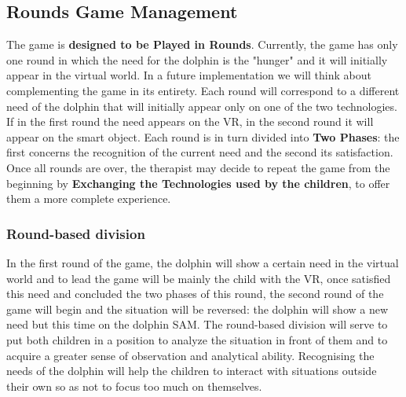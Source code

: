 \documentclass [12pt]{article}
\begin{document}
\subsection{Rounds Game Management}
The game is \textbf{designed to be Played in Rounds}. Currently, the game has only one round in which the need for the dolphin is the "hunger" and it  will initially appear in the virtual world. In a future implementation we will think about complementing the game in its entirety. 
Each round will correspond to a different need of the dolphin that will initially appear only on one of the two technologies. If in the first round the need appears on the VR, in the second round it will appear on the smart object. Each round is in turn divided into \textbf{Two Phases}: the first concerns the recognition of the current need and the second its satisfaction. Once all rounds are over, the therapist may decide to repeat the game from the beginning by \textbf{Exchanging the Technologies used by the children}, to offer them a more complete experience.
\subsubsection{Round-based division}
In the first round of the game, the dolphin will show a certain need in the virtual world and to lead the game will be mainly the child with the VR, once satisfied this need and concluded the two phases of this round, the second round of the game will begin and the situation will be reversed: the dolphin will show a new need but this time on the dolphin SAM. The round-based division will serve to put both children in a position to analyze the situation in front of them and to acquire a greater sense of observation and analytical ability. Recognising the needs of the dolphin will help the children to interact with situations outside their own so as not to focus too much on themselves.
\end{document}
